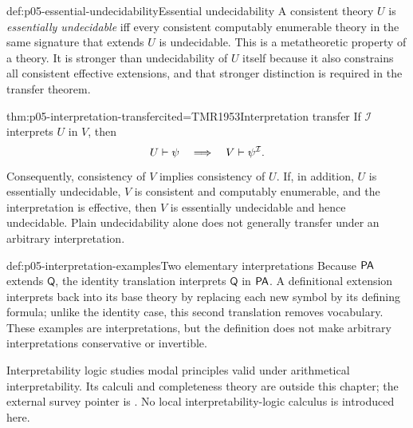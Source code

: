 \begin{hbdefinition}{def:p05-essential-undecidability}{Essential undecidability}
A consistent theory \(U\) is \emph{essentially undecidable} iff every
consistent computably enumerable theory in the same signature that
extends \(U\) is undecidable.  This is a metatheoretic property of a
theory.  It is stronger than undecidability of \(U\) itself because it
also constrains all consistent effective extensions, and that stronger
distinction is required in the transfer theorem.
\end{hbdefinition}

\begin{hbtheorem}{thm:p05-interpretation-transfer}{cited=TMR1953}{Interpretation transfer}
If \(\mathcal I\) interprets \(U\) in \(V\), then
\[
  U\vdash\psi\quad\Longrightarrow\quad
  V\vdash\psi^{\mathcal I}.
\]
Consequently, consistency of \(V\) implies consistency of \(U\).  If,
in addition, \(U\) is essentially undecidable, \(V\) is consistent and
computably enumerable, and the interpretation is effective, then \(V\)
is essentially undecidable and hence undecidable.  Plain undecidability
alone does not generally transfer under an arbitrary interpretation.
\end{hbtheorem}

\begin{hbexample}{def:p05-interpretation-examples}{Two elementary interpretations}
Because \(\mathsf{PA}\) extends \(\mathsf Q\), the identity translation interprets
\(\mathsf Q\) in \(\mathsf{PA}\).  A definitional extension interprets back into
its base theory by replacing each new symbol by its defining formula;
unlike the identity case, this second translation removes vocabulary.
These examples are interpretations, but the definition does not make
arbitrary interpretations conservative or invertible.
\end{hbexample}

Interpretability logic studies modal principles valid under arithmetical
interpretability.  Its calculi and completeness theory are outside this
chapter; the external survey pointer is \cite{Visser1997}.  No local
interpretability-logic calculus is introduced here.
